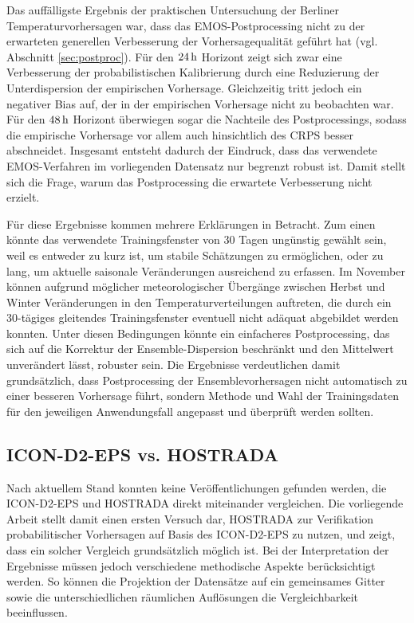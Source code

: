 Das auffälligste Ergebnis der praktischen Untersuchung der Berliner Temperaturvorhersagen war, dass das EMOS-Postprocessing nicht zu der erwarteten generellen Verbesserung der Vorhersagequalität geführt hat (vgl. Abschnitt \ref{sec:postproc}). Für den $24\,\mathrm{h}$ Horizont zeigt sich zwar eine Verbesserung der probabilistischen Kalibrierung durch eine Reduzierung der Unterdispersion der empirischen Vorhersage. Gleichzeitig tritt jedoch ein negativer Bias auf, der in der empirischen Vorhersage nicht zu beobachten war. Für den $48\,\mathrm{h}$ Horizont überwiegen sogar die Nachteile des Postprocessings, sodass die empirische Vorhersage vor allem auch hinsichtlich des CRPS besser abschneidet.
Insgesamt entsteht dadurch der Eindruck, dass das verwendete EMOS-Verfahren im vorliegenden Datensatz nur begrenzt robust ist. Damit stellt sich die Frage, warum das Postprocessing die erwartete Verbesserung nicht erzielt.

Für diese Ergebnisse kommen mehrere Erklärungen in Betracht. Zum einen könnte das verwendete Trainingsfenster von 30 Tagen ungünstig gewählt sein, weil es entweder zu kurz ist, um stabile Schätzungen zu ermöglichen, oder zu lang, um aktuelle saisonale Veränderungen ausreichend zu erfassen. Im November können aufgrund möglicher meteorologischer Übergänge zwischen Herbst und Winter Veränderungen in den Temperaturverteilungen auftreten, die durch ein 30-tägiges gleitendes Trainingsfenster eventuell nicht adäquat abgebildet werden konnten. Unter diesen Bedingungen könnte ein einfacheres Postprocessing, das sich auf die Korrektur der Ensemble-Dispersion beschränkt und den Mittelwert unverändert lässt, robuster sein. Die Ergebnisse verdeutlichen damit grundsätzlich, dass Postprocessing der Ensemblevorhersagen nicht automatisch zu einer besseren Vorhersage führt, sondern Methode und Wahl der Trainingsdaten für den jeweiligen Anwendungsfall angepasst und überprüft werden sollten.

\subsection{ICON-D2-EPS vs. HOSTRADA}
Nach aktuellem Stand konnten keine Veröffentlichungen gefunden werden, die ICON-D2-EPS und HOSTRADA direkt miteinander vergleichen. Die vorliegende Arbeit stellt damit einen ersten Versuch dar, HOSTRADA zur Verifikation probabilitischer Vorhersagen auf Basis des ICON-D2-EPS zu nutzen, und zeigt, dass ein solcher Vergleich grundsätzlich möglich ist. Bei der Interpretation der Ergebnisse müssen jedoch verschiedene methodische Aspekte berücksichtigt werden. So können die Projektion der Datensätze auf ein gemeinsames Gitter sowie die unterschiedlichen räumlichen Auflösungen die Vergleichbarkeit beeinflussen.

